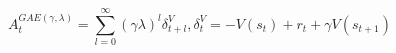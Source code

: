 $$A_t^{GAE(\gamma,\lambda)} = \sum_{l=0}^{\infty}(\gamma\lambda)^l\delta_{t+l}^V, \delta_t^V = -V(s_t) + r_t + γV(s_{t+1})$$


